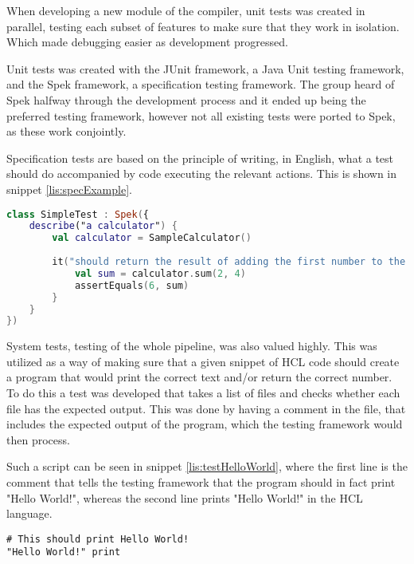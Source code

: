 When developing a new module of the compiler, unit tests was created in parallel, testing each subset of features to make sure that they work in isolation. 
Which made debugging easier as development progressed.

Unit tests was created with the JUnit\cite{JUnit} framework, a Java Unit testing framework, and the Spek\cite{SpekFramework} framework, a specification testing framework. 
The group heard of Spek halfway through the development process and it ended up being the preferred testing framework, however not all existing tests were ported to Spek, as these work conjointly.

Specification tests are based on the principle of writing, in English, what a test should do accompanied by code executing the relevant actions.
This is shown in snippet \ref{lis:specExample}.

\begin{lstlisting}[language=Kotlin,label={lis:specExample},caption={Example of a unit test with spec}]
class SimpleTest : Spek({
	describe("a calculator") {
		val calculator = SampleCalculator()
		
		it("should return the result of adding the first number to the second number") {
			val sum = calculator.sum(2, 4)
			assertEquals(6, sum)
		}
	}
})
\end{lstlisting}

System tests, testing of the whole pipeline, was also valued highly.
This was utilized as a way of making sure that a given snippet of HCL code should create a program that would print the correct text and/or return the correct number.
To do this a test was developed that takes a list of files and checks whether each file has the expected output.
This was done by having a comment in the file, that includes the expected output of the program, which the testing framework would then process. 

Such a script can be seen in snippet \ref{lis:testHelloWorld}, where the first line is the comment that tells the testing framework that the program should in fact print "Hello World!", whereas the second line prints "Hello World!" in the HCL language.
\begin{lstlisting}[language=HCL,label=lis:testHelloWorld,firstnumber=1,caption={A HCL test-script as part of the testing framework}]
# This should print Hello World!
"Hello World!" print
\end{lstlisting}

